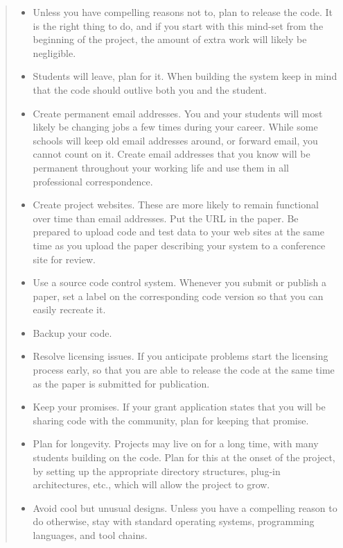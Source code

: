\documentclass[
]{book}
\providecommand{\tightlist}{%
  \setlength{\itemsep}{0pt}\setlength{\parskip}{0pt}}
\begin{document}
\begin{quote}
\begin{itemize}
\tightlist
\item
  Unless you have compelling reasons not to, plan to release the code. It is the right thing to do, and if you start with this mind-set from the beginning of the project, the amount of extra work will likely be negligible.
\item
  Students will leave, plan for it. When building the system keep in mind that the code should outlive both you and the student.
\item
  Create permanent email addresses. You and your students will most likely be changing jobs a few times during your career. While some schools will keep old email addresses around, or forward email, you cannot count on it. Create email addresses that you know will be permanent throughout your working life and use them in all professional correspondence.
\item
  Create project websites. These are more likely to remain functional over time than email addresses. Put the URL in the paper. Be prepared to upload code and test data to your web sites at the same time as you upload the paper describing your system to a conference site for review.
\item
  Use a source code control system. Whenever you submit or publish a paper, set a label on the corresponding code version so that you can easily recreate it.
\item
  Backup your code.
\item
  Resolve licensing issues. If you anticipate problems start the licensing process early, so that you are able to release the code at the same time as the paper is submitted for publication.
\item
  Keep your promises. If your grant application states that you will be sharing code with the community, plan for keeping that promise.
\item
  Plan for longevity. Projects may live on for a long time, with many students building on the code. Plan for this at the onset of the project, by setting up the appropriate directory structures, plug-in architectures, etc., which will allow the project to grow.
\item
  Avoid cool but unusual designs. Unless you have a compelling reason to do otherwise, stay with standard operating systems, programming languages, and tool chains.
\end{itemize}
\end{quote}
\end{document}
